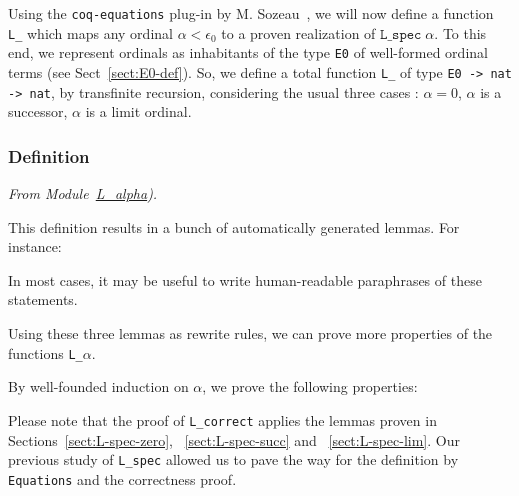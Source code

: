 
Using the \texttt{coq-equations} plug-in by 
M. Sozeau~\cite{sozeau:hal-01671777}, we will now define a function \texttt{L\_} which maps any ordinal  $\alpha<\epsilon_0$ to a proven realization of 
$\texttt{L\_spec}\;\alpha$.   
To this end, we represent ordinals as inhabitants of the type 
\texttt{E0} of well-formed ordinal terms (see Sect~\vref{sect:E0-def}). So, we define a total function \texttt{L\_} of type
\texttt{E0 -> nat -> nat}, by transfinite recursion, considering the usual three cases : $\alpha=0$, $\alpha$ is a successor, $\alpha$ is a limit ordinal.
 

\subsubsection{Definition}



\vspace{4pt}
\noindent
\emph{From Module~\href{../theories/html/hydras.Epsilon0.L_alpha.html\#L_}{L\_alpha}).}

\label{Functions:L-alpha}


 
This definition results in a bunch of automatically generated lemmas. For instance:





In most cases, it may be useful to write human-readable  paraphrases of these statements.



Using these three lemmas as rewrite rules, we can prove more properties of the functions \texttt{L\_$\alpha$}.



By  well-founded induction on $\alpha$, we prove the following properties:





\label{sect:L-correct-proof}

Please note that the proof of \texttt{L\_correct} applies the lemmas proven in Sections~\ref{sect:L-spec-zero}, ~\ref{sect:L-spec-succ} and ~\ref{sect:L-spec-lim}.
Our previous study of \texttt{L\_spec} allowed us to pave the way for the definition by \texttt{Equations} and the correctness proof.




